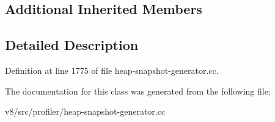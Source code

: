 \subsection*{Additional Inherited Members}


\subsection{Detailed Description}


Definition at line 1775 of file heap-\/snapshot-\/generator.\+cc.



The documentation for this class was generated from the following file\+:\begin{DoxyCompactItemize}
\item 
v8/src/profiler/heap-\/snapshot-\/generator.\+cc\end{DoxyCompactItemize}

